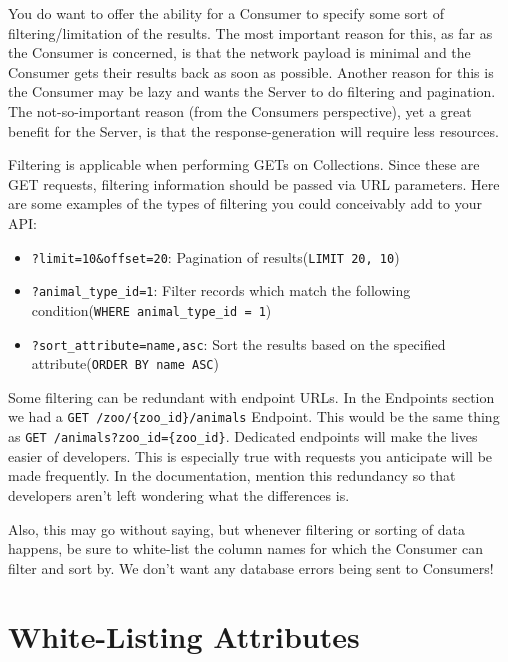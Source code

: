 \documentclass{book}
\begin{document}
You do want to offer the ability for a Consumer to specify some sort of filtering/limitation of the results. The most important reason for this, as far as the Consumer is concerned, is that the network payload is minimal and the Consumer gets their results back as soon as possible. Another reason for this is the Consumer may be lazy and wants the Server to do filtering and pagination. The not-so-important reason (from the Consumers perspective), yet a great benefit for the Server, is that the response-generation will require less resources.

Filtering is applicable when performing GETs on Collections. Since these are GET requests, filtering information should be passed via URL parameters. Here are some examples of the types of filtering you could conceivably add to your API:

\begin{itemize}
\item \texttt{?limit=10\&offset=20}: Pagination of results\newline{}(\texttt{LIMIT 20, 10})
\item \texttt{?animal\_type\_id=1}: Filter records which match the following condition\newline{}(\texttt{WHERE animal\_type\_id = 1})
\item \texttt{?sort\_attribute=name,asc}: Sort the results based on the specified attribute\newline{}(\texttt{ORDER BY name ASC})
\end{itemize}

Some filtering can be redundant with endpoint URLs. In the Endpoints section we had a \texttt{GET /zoo/\{zoo\_id\}/animals} Endpoint. This would be the same thing as \texttt{GET /animals?zoo\_id=\{zoo\_id\}}. Dedicated endpoints will make the lives easier of developers. This is especially true with requests you anticipate will be made frequently. In the documentation, mention this redundancy so that developers aren't left wondering what the differences is.

Also, this may go without saying, but whenever filtering or sorting of data happens, be sure to white-list the column names for which the Consumer can filter and sort by. We don't want any database errors being sent to Consumers!


\section{White-Listing Attributes}
\end{document}
